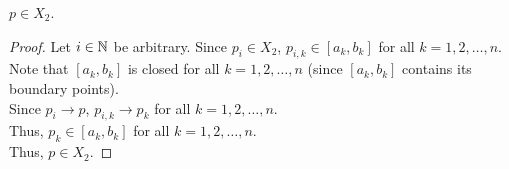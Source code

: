 \begin{problem}
\begin{enumroman}
\begin{answer}
        \begin{claim}
          $p \in X_2$.
          \begin{proof}
            Let $i \in \mathbb{N}$ be arbitrary.
            Since $p_i \in X_2$, $p_{i, k} \in [a_k, b_k]$ for all $k = 1, 2, \dots, n$. \\
            Note that $[a_k, b_k]$ is closed for all $k = 1, 2, \dots, n$ (since $[a_k, b_k]$ contains its boundary points). \\
            Since $p_i \to p$, $p_{i, k} \to p_k$ for all $k = 1, 2, \dots, n$. \\
            Thus, $p_k \in [a_k, b_k]$ for all $k = 1, 2, \dots, n$. \\
            Thus, $p \in X_2$.
          \end{proof}
        \end{claim}
      \end{answer}
  \end{enumroman}
\end{problem}
